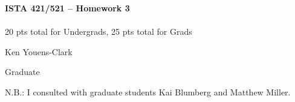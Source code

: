 \documentclass[10pt]{article}
\begin{document}
\begin{center}
    {\Large {\bf ISTA 421/521 -- Homework 3}} \\
     \\
    20 pts total for Undergrads, 25 pts total for Grads
    
\end{center}

\begin{flushright}
Ken Youens-Clark

Graduate 
\end{flushright}

N.B.: I consulted with graduate students Kai Blumberg and Matthew Miller.

\vspace{1cm}


\end{document}
